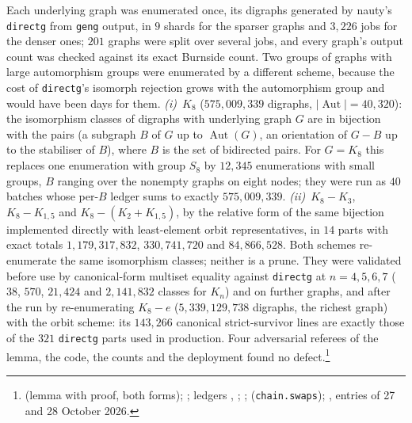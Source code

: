 \documentclass[11pt]{article}
\theoremstyle{definition}
\begin{document}
Each underlying graph was enumerated once, its digraphs generated by nauty's \texttt{directg} from \texttt{geng} output,
in $9$ shards for the sparser graphs and $3{,}226$ jobs for the denser ones; $201$ graphs were split over several jobs,
and every graph's output count was checked against its exact Burnside count. Two groups of graphs with large
automorphism groups were enumerated by a different scheme, because the cost of \texttt{directg}'s isomorph rejection grows
with the automorphism group and would have been days for them. \emph{(i)}~$K_8$ ($575{,}009{,}339$ digraphs,
$|\operatorname{Aut}|=40{,}320$): the isomorphism classes of digraphs with underlying graph $G$ are in bijection with the
pairs (a subgraph $B$ of $G$ up to $\operatorname{Aut}(G)$, an orientation of $G-B$ up to the stabiliser of $B$), where
$B$ is the set of bidirected pairs. For $G=K_8$ this replaces one enumeration with group $S_8$ by $12{,}345$ enumerations
with small groups, $B$ ranging over the nonempty graphs on eight nodes; they were run as $40$ batches whose per-$B$ ledger
sums to exactly $575{,}009{,}339$. \emph{(ii)}~$K_8-K_3$, $K_8-K_{1,5}$ and $K_8-(K_2+K_{1,5})$, by the relative form
of the same bijection implemented directly with least-element orbit representatives, in $14$ parts with exact totals
$1{,}179{,}317{,}832$, $330{,}741{,}720$ and $84{,}866{,}528$. Both schemes re-enumerate the same isomorphism classes;
neither is a prune. They were validated before use by canonical-form multiset equality against \texttt{directg} at
$n=4,5,6,7$ ($38$, $570$, $21{,}424$ and $2{,}141{,}832$ classes for $K_n$) and on further graphs, and after the run by
re-enumerating $K_8-e$ ($5{,}339{,}129{,}738$ digraphs, the richest graph) with the orbit scheme: its $143{,}266$
canonical strict-survivor lines are exactly those of the $321$ \texttt{directg} parts used in production. Four
adversarial referees of the lemma, the code, the counts and the deployment found no defect.\footnote{
(lemma with proof, both forms); ; ledgers ,
; ;  (\texttt{chain.swaps});
, entries of 27 and 28 October 2026.}
\end{document}
